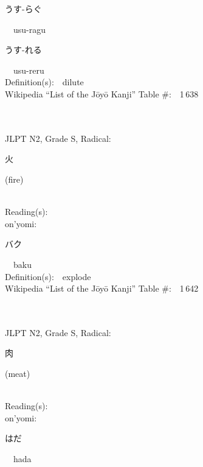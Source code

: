 \begin{multicols}{2}
{\hspace*{2em}}{\begin{CJK}{UTF8}{min} うす-らぐ \end{CJK}}\ \ usu-ragu\ \ \\
{\hspace*{2em}}{\begin{CJK}{UTF8}{min} うす-れる \end{CJK}}\ \ usu-reru\ \ \\
Definition(s):\ \ dilute \\
Wikipedia ``List of the J\=oy\=o Kanji'' Table \#:\ \ 1\,638 \\
\ \ \\
{\fontsize{34pt}{40pt}  }\ \ \\  %
{JLPT N2, Grade S, Radical:\ \ {\begin{CJK}{UTF8}{min} 火 \end{CJK}} (fire) } \\
Reading(s):\ \ \\
{\hspace*{1em}}on'yomi:\ \ \\
{\hspace*{2em}}{\begin{CJK}{UTF8}{min} バク \end{CJK}}\ \ baku\ \ \\
Definition(s):\ \ explode \\
Wikipedia ``List of the J\=oy\=o Kanji'' Table \#:\ \ 1\,642 \\
\ \ \\
{\fontsize{34pt}{40pt}  }\ \ \\  %
{JLPT N2, Grade S, Radical:\ \ {\begin{CJK}{UTF8}{min} 肉 \end{CJK}} (meat) } \\
Reading(s):\ \ \\
{\hspace*{1em}}on'yomi:\ \ \\
{\hspace*{2em}}{\begin{CJK}{UTF8}{min} はだ \end{CJK}}\ \ hada\ \ \\

\end{multicols}
